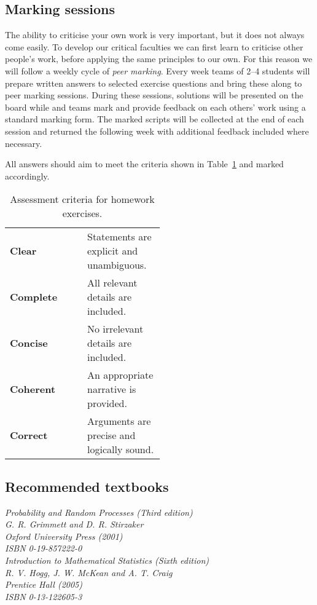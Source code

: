 \subsection*{Marking sessions}
The ability to criticise your own work is very important, but it does not always come easily. To develop our critical faculties we can first learn to criticise other people's work, before applying the same principles to our own. For this reason we will follow a weekly cycle of \emph{peer marking}. Every week teams of 2--4 students will prepare written answers to selected exercise questions and bring these along to peer marking sessions. During these sessions, solutions will be presented on the board while and teams mark and provide feedback on each others' work using a standard marking form. The marked scripts will be collected at the end of each session and returned the following week with additional feedback included where necessary. 

\smallskip
All answers should aim to meet the criteria shown in Table~\ref{tab:assessment_criteria} and marked accordingly.
\begin{table}[htb]
\centering
\begin{tabular}{|lp{0.5\linewidth}|}\hline
\textbf{Clear}		& Statements are explicit and unambiguous. \\
\textbf{Complete}	& All relevant details are included. \\
\textbf{Concise}	& No irrelevant details are included. \\
\textbf{Coherent}	& An appropriate narrative is provided. \\
\textbf{Correct}	& Arguments are precise and logically sound. \\ \hline
\end{tabular}
\caption{Assessment criteria for homework exercises.\label{tab:assessment_criteria}}
\end{table}

\subsection*{Recommended textbooks}
\ben
\it
Probability and Random Processes (Third edition) \\
G. R. Grimmett and D. R. Stirzaker \\
Oxford University Press (2001) \\
ISBN 0-19-857222-0 \\[2ex]
\it	
Introduction to Mathematical Statistics (Sixth edition) \\
R. V. Hogg, J. W. McKean and A. T. Craig \\
Prentice Hall (2005) \\
ISBN 0-13-122605-3 \\
\een

